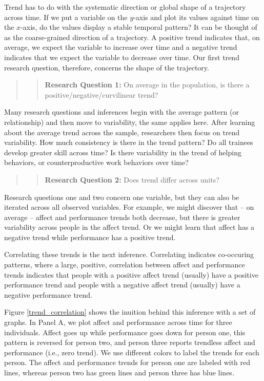 \documentclass[english,,man]{apa6}
\theoremstyle{definition}
\theoremstyle{definition}
\theoremstyle{definition}
\theoremstyle{remark}
\begin{document}
Trend has to do with the systematic direction or global shape of a
trajectory across time. If we put a variable on the \(y\)-axis and plot
its values against time on the \(x\)-axis, do the values display a
stable temporal pattern? It can be thought of as the coarse-grained
direction of a trajectory. A positive trend indicates that, on average,
we expect the variable to increase over time and a negative trend
indicates that we expect the variable to decrease over time. Our first
trend research question, therefore, concerns the shape of the
trajectory.

\begin{quote}
\begin{quote}
\textbf{Research Question 1:} On average in the population, is there a
positive/negative/curvilinear trend?
\end{quote}
\end{quote}

Many research questions and inferences begin with the average pattern
(or relationship) and then move to variability, the same applies here.
After learning about the average trend across the sample, researchers
then focus on trend variability. How much consistency is there in the
trend pattern? Do all trainees develop greater skill across time? Is
there variability in the trend of helping behaviors, or
counterproductive work behaviors over time?

\begin{quote}
\begin{quote}
\textbf{Research Question 2:} Does trend differ across units?
\end{quote}
\end{quote}

Research questions one and two concern one variable, but they can also
be iterated across all observed variables. For example, we might
discover that -- on average -- affect and performance trends both
decrease, but there is greater variability across people in the affect
trend. Or we might learn that affect has a negative trend while
performance has a positive trend.

Correlating these trends is the next inference. Correlating indicates
co-occuring patterns, where a large, positive, correlation between
affect and performance trends indicates that people with a positive
affect trend (usually) have a positive performance trend and people with
a negative affect trend (usually) have a negative performance trend.

Figure \ref{trend_correlation} shows the inuition behind this inference
with a set of graphs. In Panel A, we plot affect and performance across
time for three individuals. Affect goes up while performance goes down
for person one, this pattern is reversed for person two, and person
three reports trendless affect and performance (i.e., zero trend). We
use different colors to label the trends for each person. The affect and
performance trends for person one are labeled with red lines, whereas
person two has green lines and person three has blue lines.
\end{document}
